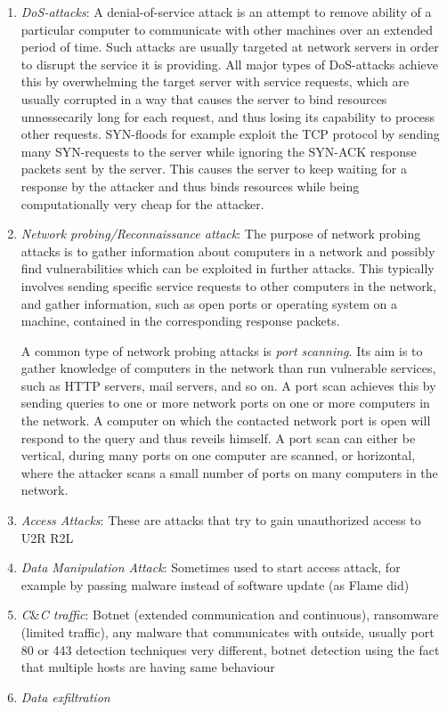 \documentclass[a4paper,12pt,twoside]{report}
\begin{document}
\begin{enumerate}
\item \textit{DoS-attacks}: A denial-of-service attack is an attempt to remove ability of a particular computer to communicate with other machines over an extended period of time. Such attacks are usually targeted at network servers in order to disrupt the service it is providing. All major types of DoS-attacks achieve this by overwhelming the target server with service requests, which are usually corrupted in a way that causes the server to bind resources unnessecarily long for each request, and thus losing its capability to process other requests. SYN-floods for example exploit the TCP protocol by sending many SYN-requests to the server while ignoring the SYN-ACK response packets sent by the server. This causes the server to keep waiting for a response by the attacker and thus binds resources while being computationally very cheap for the attacker.

\item \textit{Network probing/Reconnaissance attack}: The purpose of network probing attacks is to gather information about computers in a network and possibly find vulnerabilities which can be exploited in further attacks. This typically involves sending specific service requests to other computers in the network, and gather information, such as open ports or operating system on a machine, contained in the corresponding response packets.

A common type of network probing attacks is \textit{port scanning}. Its aim is to gather knowledge of computers in the network than run vulnerable services, such as HTTP servers, mail servers, and so on. A port scan achieves this by sending queries to one or more network ports on one or more computers in the network. A computer on which the contacted network port is open will respond to the query and thus reveils himself. A port scan can either be vertical, during many ports on one computer are scanned, or horizontal, where the attacker scans a small number of ports on many computers in the network. 

\item \textit{Access Attacks}: These are attacks that try to gain unauthorized access to 
U2R R2L 

\item \textit{Data Manipulation Attack}: Sometimes used to start access attack, for example by passing malware instead of software update (as Flame did)

\item \textit{C}\&\textit{C traffic}: Botnet (extended communication and continuous), ransomware (limited traffic), any malware that communicates with outside, usually port 80 or 443 detection techniques very different, botnet detection using the fact that multiple hosts are having same behaviour

\item \textit{Data exfiltration}

\end{enumerate}
\end{document}
